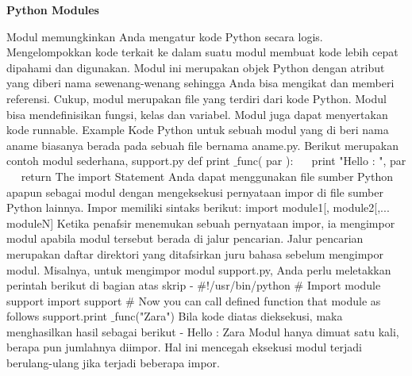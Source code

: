 
\sloppy
\begin{center}{\fontsize{16pt}{16pt}\selectfont \textbf{Python Modules} \\}\end{center}
Modul memungkinkan Anda mengatur kode Python secara logis. Mengelompokkan kode terkait ke dalam suatu modul membuat kode lebih cepat dipahami dan digunakan. Modul ini merupakan objek Python dengan atribut yang diberi nama sewenang-wenang sehingga Anda bisa mengikat dan memberi referensi.
Cukup, modul merupakan file yang terdiri dari kode Python. Modul bisa mendefinisikan fungsi, kelas dan variabel. Modul juga dapat menyertakan kode runnable.
Example
Kode Python untuk sebuah modul yang di beri nama aname biasanya berada pada sebuah file bernama aname.py. Berikut merupakan contoh modul sederhana, support.py 
 \hspace*{0.5in} def print $  \_  $func( par ): 
 \hspace*{0.5in} ~~ print "Hello : ", par 
 \hspace*{0.5in} ~~ return
The $  $import $  $Statement
Anda dapat menggunakan file sumber Python apapun sebagai modul dengan mengeksekusi pernyataan impor di file sumber Python lainnya. Impor memiliki sintaks berikut: 
 \hspace*{0.5in} import module1[, module2[,... moduleN] 
Ketika penafsir menemukan sebuah pernyataan impor, ia mengimpor modul apabila modul tersebut berada di jalur pencarian. Jalur pencarian merupakan daftar direktori yang ditafsirkan juru bahasa sebelum mengimpor modul. Misalnya, untuk mengimpor modul support.py, Anda perlu meletakkan perintah berikut di bagian atas skrip - 
 \hspace*{0.5in}  $  \#  $!/usr/bin/python 
 \hspace*{0.5in}  $  \#  $ Import module support 
 \hspace*{0.5in} import support 
 \hspace*{0.5in}  $  \#  $ Now you can call defined function that module as follows 
 \hspace*{0.5in} support.print $  \_  $func("Zara") 
Bila kode diatas dieksekusi, maka menghasilkan hasil sebagai berikut - 
 \hspace*{0.5in} Hello : Zara 
Modul hanya dimuat satu kali, berapa pun jumlahnya diimpor. Hal ini mencegah eksekusi modul terjadi berulang-ulang jika terjadi beberapa impor.

